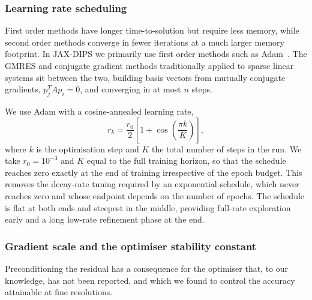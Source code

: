 
\subsubsection{Learning rate scheduling}

First order methods have longer time-to-solution but require less memory, while second
order methods converge in fewer iterations at a much larger memory footprint. In
JAX-DIPS we primarily use first order methods such as Adam~\cite{kingma2014}. The
GMRES and conjugate gradient methods traditionally applied to sparse linear systems sit
between the two, building basis vectors from mutually conjugate gradients,
$p_j^{T} A p_i = 0$, and converging in at most $n$ steps.

We use Adam with a cosine-annealed learning rate,
\begin{equation}
    r_k = \frac{r_0}{2}\left[1 + \cos\!\left(\frac{\pi k}{K}\right)\right],
    \label{eq:cosine}
\end{equation}
where $k$ is the optimisation step and $K$ the total number of steps in the run. We
take $r_0 = 10^{-3}$ and $K$ equal to the full training horizon, so that the schedule
reaches zero exactly at the end of training irrespective of the epoch budget. This
removes the decay-rate tuning required by an exponential schedule, which never reaches
zero and whose endpoint depends on the number of epochs. The schedule is flat at both
ends and steepest in the middle, providing full-rate exploration early and a long
low-rate refinement phase at the end.

\subsubsection{Gradient scale and the optimiser stability constant}
\label{sec:eps}

Preconditioning the residual has a consequence for the optimiser that, to our
knowledge, has not been reported, and which we found to control the accuracy attainable
at fine resolutions.

